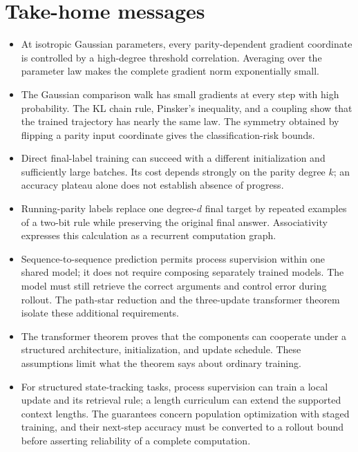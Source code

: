 \documentclass[11pt,twoside]{article}
\theoremstyle{definition}
\theoremstyle{remark}
\begin{document}
\section{Take-home messages}

\begin{itemize}[leftmargin=*]
\item At isotropic Gaussian parameters, every parity-dependent gradient
coordinate is controlled by a high-degree threshold correlation. Averaging
over the parameter law makes the complete gradient norm exponentially small.
\item The Gaussian comparison walk has small gradients at every step with high
probability. The KL chain rule, Pinsker's inequality, and a coupling show that
the trained trajectory has nearly the same law. The symmetry obtained by
flipping a parity input coordinate gives the classification-risk bounds.
\item Direct final-label training can succeed with a different initialization
and sufficiently large batches. Its cost depends strongly on the parity
degree $k$; an accuracy plateau alone does not establish absence of progress.
\item Running-parity labels replace one degree-$d$ final target by repeated
examples of a two-bit rule while preserving the original final answer.
Associativity expresses this calculation as a recurrent computation graph.
\item Sequence-to-sequence prediction permits process supervision within one
shared model; it does not require composing separately trained models. The
model must still retrieve the correct arguments and control error during
rollout. The path-star reduction and the three-update transformer theorem
isolate these additional requirements.
\item The transformer theorem proves that the components can cooperate under a
structured architecture, initialization, and update schedule. These
assumptions limit what the theorem says about ordinary training.
\item For structured state-tracking tasks, process supervision can train a
local update and its retrieval rule; a length curriculum can extend the
supported context lengths. The guarantees concern population optimization
with staged training, and their next-step accuracy must be converted to a
rollout bound before asserting reliability of a complete computation.
\end{itemize}

\printendnotes
\end{document}
